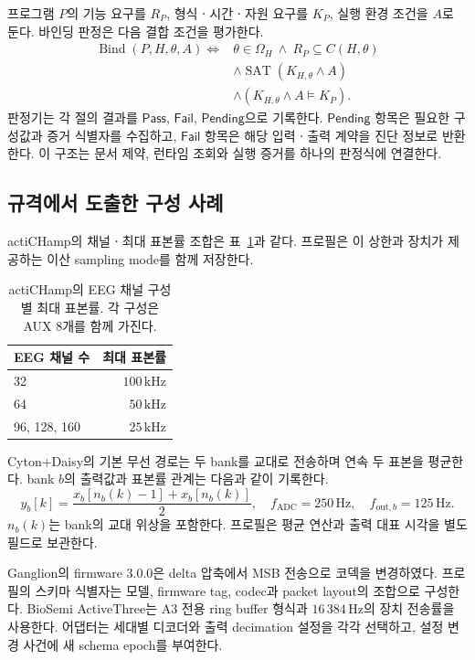 프로그램 $P$의 기능 요구를 $R_P$, 형식ㆍ시간ㆍ자원 요구를 $K_P$, 실행 환경 조건을 $A$로 둔다.
바인딩 판정은 다음 결합 조건을 평가한다.
\begin{equation}
 \begin{aligned}
 \operatorname{Bind}(P,H,\theta,A)\iff{}&
 \theta\in\Omega_H\ \land\ R_P\subseteq C(H,\theta)\\
 &\land\operatorname{SAT}(K_{H,\theta}\land A)\\
 &\land(K_{H,\theta}\land A\models K_P).
 \end{aligned}
 \label{eq:bind}
\end{equation}
판정기는 각 절의 결과를 $\mathsf{Pass}$, $\mathsf{Fail}$, $\mathsf{Pending}$으로 기록한다.
$\mathsf{Pending}$ 항목은 필요한 구성값과 증거 식별자를 수집하고,
$\mathsf{Fail}$ 항목은 해당 입력ㆍ출력 계약을 진단 정보로 반환한다.
이 구조는 문서 제약, 런타임 조회와 실행 증거를 하나의 판정식에 연결한다.

\subsection{규격에서 도출한 구성 사례}
actiCHamp의 채널ㆍ최대 표본률 조합은 표~\ref{tab:actichamp}과 같다\cite{actichamp}.
프로필은 이 상한과 장치가 제공하는 이산 sampling mode를 함께 저장한다.
\begin{table}[tb]
\centering\small
\caption{actiCHamp의 EEG 채널 구성별 최대 표본률. 각 구성은 AUX 8개를 함께 가진다.}
\begin{tabular}{@{}lr@{}}
\toprule EEG 채널 수 & 최대 표본률 \\\midrule
32 & $100\,\mathrm{kHz}$ \\
64 & $50\,\mathrm{kHz}$ \\
96, 128, 160 & $25\,\mathrm{kHz}$ \\
\bottomrule
\end{tabular}
\label{tab:actichamp}
\end{table}

Cyton+Daisy의 기본 무선 경로는 두 bank를 교대로 전송하며 연속 두 표본을 평균한다\cite{cyton}.
bank $b$의 출력값과 표본률 관계는 다음과 같이 기록한다.
\begin{equation}
 y_b[k]=\frac{x_b[n_b(k)-1]+x_b[n_b(k)]}{2},
 \quad f_{\mathrm{ADC}}=250\,\mathrm{Hz},
 \quad f_{\mathrm{out},b}=125\,\mathrm{Hz}.
\end{equation}
$n_b(k)$는 bank의 교대 위상을 포함한다. 프로필은 평균 연산과 출력 대표 시각을
별도 필드로 보관한다.

Ganglion의 firmware 3.0.0은 delta 압축에서 MSB 전송으로 코덱을 변경하였다\cite{ganglion_release}.
프로필의 스키마 식별자는 모델, firmware tag, codec과 packet layout의 조합으로 구성한다.
BioSemi ActiveThree는 A3 전용 ring buffer 형식과 $16\,384\,\mathrm{Hz}$의 장치 전송률을
사용한다\cite{biosemi_a3,biosemi_rate}. 어댑터는 세대별 디코더와 출력 decimation 설정을
각각 선택하고, 설정 변경 사건에 새 schema epoch를 부여한다.

